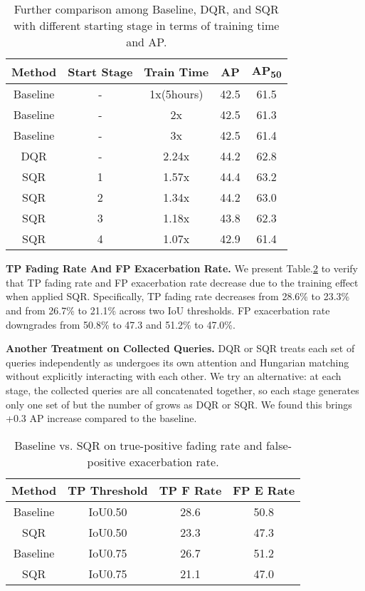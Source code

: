 \documentclass[10pt,twocolumn,letterpaper]{article}
\begin{document}
\begin{table}[]
    \centering
    \begin{tabular}{c|c|c|c|c}
    \toprule[1pt]
    Method & Start Stage   & Train Time &  AP   & AP\textsubscript{50}     \\ \midrule
    Baseline &  -    &1x(5hours)&  42.5   &  61.5      \\
    Baseline &  -    &  2x   &  42.5   &  61.3      \\
    Baseline &  -    &  3x   &  42.5   &  61.4      \\
    DQR      &  -    &  2.24x&  44.2   &  62.8      \\
    SQR      &  1    &  1.57x&  44.4   &  63.2      \\
    SQR      &  2    &  1.34x&  44.2   &  63.0      \\
    SQR      &  3    &  1.18x&  43.8   &  62.3      \\
    SQR      &  4    &  1.07x&  42.9   &  61.4      \\
    \bottomrule
    \end{tabular}
    \caption{Further comparison among Baseline, DQR, and SQR with different starting stage in terms of training time and AP.}
    \label{tab:startingstage}
\end{table}

\textbf{TP Fading Rate And FP Exacerbation Rate.}
We present Table.\ref{tab:ablation_FErates} to verify that TP fading rate and FP exacerbation rate decrease due to the training effect when applied SQR. Specifically, TP fading rate decreases from 28.6\% to 23.3\% and from 26.7\% to 21.1\% across two IoU thresholds. FP exacerbation rate downgrades from 50.8\% to 47.3 and 51.2\% to 47.0\%.   

\textbf{Another Treatment on Collected Queries.} DQR or SQR treats each set of queries  independently as  undergoes its own attention and Hungarian matching without explicitly interacting with each other. We try an alternative: at each stage, the collected queries are all concatenated together, so each stage generates only one set of  but the number of  grows as DQR or SQR. We found this brings +0.3 AP increase compared to the baseline.

\begin{table}[]
    \centering
    \begin{tabular}{c|c|c|c}
        \toprule[1pt]
        Method       & TP Threshold & TP F Rate & FP E Rate \\ 
        \midrule
        Baseline & IoU0.50 & 28.6   & 50.8 \\
        SQR      & IoU0.50 &  23.3  & 47.3  \\
        \midrule
        Baseline & IoU0.75 & 26.7 & 51.2  \\
        SQR      & IoU0.75 & 21.1 & 47.0  \\
        \bottomrule
    \end{tabular}
    \caption{Baseline vs. SQR on true-positive fading rate and false-positive exacerbation rate. }
    \label{tab:ablation_FErates}
\end{table}
\end{document}
